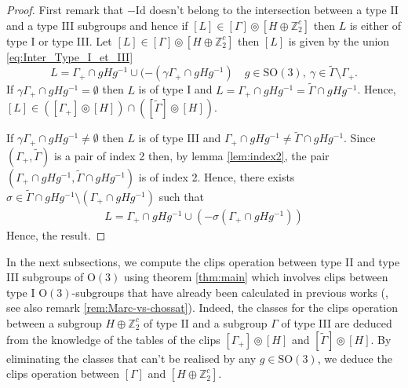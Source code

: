 \documentclass[11pt,a4paper]{amsart}
\theoremstyle{definition}
\newtheorem{rem}[thm]{Remark}
\newcommand{\ZZ}{\mathbb{Z}}                %
\newcommand{\OO}{\mathrm{O}}                %
\newcommand{\SO}{\mathrm{SO}}               %
\newcommand{\1}{\mathds{1}}		            %
\newcommand{\id}{\mathrm{Id}}                %
\begin{document}
\begin{proof}
	First remark that $-\id$ doesn't belong to the intersection between a type II and a type III subgroups and hence if $[L]\in [\Gamma]\circledcirc[H\oplus\ZZ_2^c]$ then $L$ is either of type I or type III. 
	Let $[L]\in [\Gamma]\circledcirc[H\oplus\ZZ_2^c]$ then $[L]$ is given by the union \eqref{eq:Inter_Type_I_et_III}
	\begin{equation*} 
	L=\Gamma_+\cap gHg^{-1}\cup (-(\gamma\Gamma_+\cap gHg^{-1}) \quad g\in \SO(3),\ \gamma\in \tilde{\Gamma}\setminus\Gamma_+.
	\end{equation*} 
	If $\gamma\Gamma_+\cap gH g^{-1}=\emptyset$ then $L$ is of type I and $L=\Gamma_+\cap gHg^{-1}=\tilde{\Gamma}\cap gHg^{-1}$. Hence, $[L]\in ([\Gamma_+]\circledcirc [H])\cap ([\tilde{\Gamma}]\circledcirc[H])$. 
	
	If  $\gamma\Gamma_+\cap gH g^{-1}\neq\emptyset$ then $L$ is of type III and $\Gamma_+\cap gHg^{-1}\neq \tilde{\Gamma}\cap gHg^{-1}$. Since $(\Gamma_+,\tilde{\Gamma})$ is a pair of index 2 then, by lemma \ref{lem:index2}, the pair $(\Gamma_+\cap gHg^{-1},\tilde{\Gamma}\cap gHg^{-1})$ is of index 2. Hence, there exists $\sigma\in\tilde{\Gamma}\cap gHg^{-1}\setminus (\Gamma_+\cap gHg^{-1})$ such that
	\begin{align*}
	L=\Gamma_+\cap gHg^{-1}\cup (-\sigma(\Gamma_+\cap gHg^{-1}))	\end{align*}
	Hence, the result.
\end{proof}


In the next subsections, we compute the clips operation between type II and type III subgroups of $\OO(3)$ using theorem \ref{thm:main} which involves  clips between type I $\OO(3)$-subgroups that have already been calculated in previous works (\cite{Chossat1994,Olive2019}, see also remark \ref{rem:Marc-vs-chossat}). Indeed, the classes for the clips operation between a subgroup $H\oplus \ZZ_2^c$ of type II and a subgroup $\Gamma$ of type III are deduced from the knowledge of the tables of the clips $[\Gamma_+]\circledcirc [H]$ and $[\tilde{\Gamma}]\circledcirc[H]$. By eliminating the classes that can't be realised by any $g\in \SO(3)$, we deduce the clips operation between $[\Gamma]$ and $[H\oplus \ZZ_2^c]$. %


\end{document}

